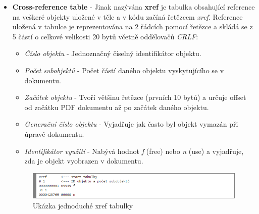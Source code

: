 \begin{itemize}
	\item \textbf{Cross-reference table} - Jinak nazývána \textbf{xref} je tabulka obsahující reference na veškeré objekty uložené v těle a v kódu začíná řetězcem \textit{xref}. Reference uložená v tabulce je reprezentována na 2 řádcích pomocí řetězce a skládá se z 5 částí o celkové velikosti 20 bytů včetně oddělovačů \textit{CRLF}:
	\begin{itemize}
		\item \textit{Číslo objektu} - Jednoznačný číselný identifikátor objektu.
		\item \textit{Počet subobjektů} - Počet částí daného objektu vyskytujícího se v dokumentu.
		\item \textit{Začátek objektu} - Tvoří většinu řetězce (prvních 10 bytů) a určuje offset od začátku PDF dokumentu až po začátek daného objektu.
		\item \textit{Generační číslo objektu} - Vyjadřuje jak často byl objekt vymazán při úpravě dokumentu. 
		\item \textit{Identifikátor využití} - Nabývá hodnot \textit{f} (free) nebo \textit{n} (use) a vyjadřuje, zda je objekt vyobrazen v dokumentu.
	\end{itemize}
	\newpage
	\begin{figure}[h!]
	\centering
	\includegraphics[width=12cm]{img/pdf_xref}
	\caption{Ukázka jednoduché xref tabulky}
	\label{fig:pdf_xref}
	\end{figure}


\end{itemize}
